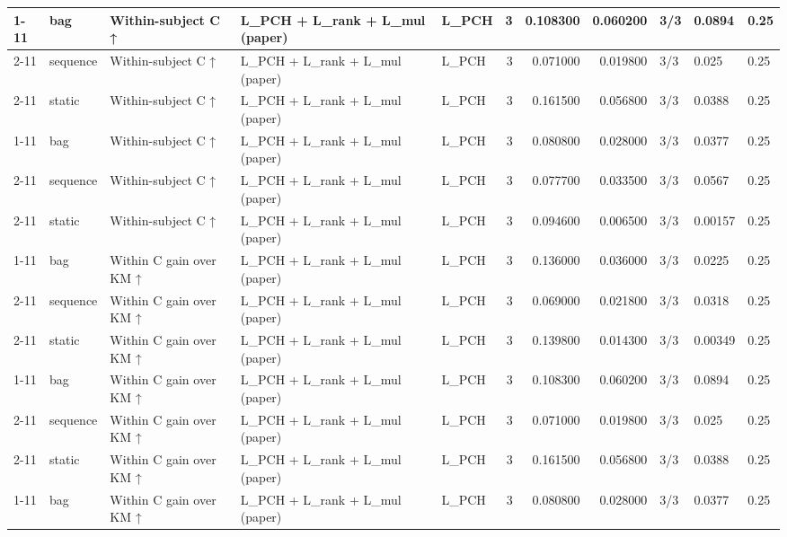 \begin{tabular}{lllllrrrlll}
\cline{1-11} \cline{2-11} \cline{3-11}
\multirow[t]{3}{*}{ehrsim2\_mixed} & bag & Within-subject C ↑ & L\_PCH + L\_rank + L\_mul (paper) & L\_PCH & 3 & 0.108300 & 0.060200 & 3/3 & 0.0894 & 0.25 \\
\cline{2-11} \cline{3-11}
 & sequence & Within-subject C ↑ & L\_PCH + L\_rank + L\_mul (paper) & L\_PCH & 3 & 0.071000 & 0.019800 & 3/3 & 0.025 & 0.25 \\
\cline{2-11} \cline{3-11}
 & static & Within-subject C ↑ & L\_PCH + L\_rank + L\_mul (paper) & L\_PCH & 3 & 0.161500 & 0.056800 & 3/3 & 0.0388 & 0.25 \\
\cline{1-11} \cline{2-11} \cline{3-11}
\multirow[t]{3}{*}{ehrsim2\_order} & bag & Within-subject C ↑ & L\_PCH + L\_rank + L\_mul (paper) & L\_PCH & 3 & 0.080800 & 0.028000 & 3/3 & 0.0377 & 0.25 \\
\cline{2-11} \cline{3-11}
 & sequence & Within-subject C ↑ & L\_PCH + L\_rank + L\_mul (paper) & L\_PCH & 3 & 0.077700 & 0.033500 & 3/3 & 0.0567 & 0.25 \\
\cline{2-11} \cline{3-11}
 & static & Within-subject C ↑ & L\_PCH + L\_rank + L\_mul (paper) & L\_PCH & 3 & 0.094600 & 0.006500 & 3/3 & 0.00157 & 0.25 \\
\cline{1-11} \cline{2-11} \cline{3-11}
\multirow[t]{3}{*}{ehrsim2\_level} & bag & Within C gain over KM ↑ & L\_PCH + L\_rank + L\_mul (paper) & L\_PCH & 3 & 0.136000 & 0.036000 & 3/3 & 0.0225 & 0.25 \\
\cline{2-11} \cline{3-11}
 & sequence & Within C gain over KM ↑ & L\_PCH + L\_rank + L\_mul (paper) & L\_PCH & 3 & 0.069000 & 0.021800 & 3/3 & 0.0318 & 0.25 \\
\cline{2-11} \cline{3-11}
 & static & Within C gain over KM ↑ & L\_PCH + L\_rank + L\_mul (paper) & L\_PCH & 3 & 0.139800 & 0.014300 & 3/3 & 0.00349 & 0.25 \\
\cline{1-11} \cline{2-11} \cline{3-11}
\multirow[t]{3}{*}{ehrsim2\_mixed} & bag & Within C gain over KM ↑ & L\_PCH + L\_rank + L\_mul (paper) & L\_PCH & 3 & 0.108300 & 0.060200 & 3/3 & 0.0894 & 0.25 \\
\cline{2-11} \cline{3-11}
 & sequence & Within C gain over KM ↑ & L\_PCH + L\_rank + L\_mul (paper) & L\_PCH & 3 & 0.071000 & 0.019800 & 3/3 & 0.025 & 0.25 \\
\cline{2-11} \cline{3-11}
 & static & Within C gain over KM ↑ & L\_PCH + L\_rank + L\_mul (paper) & L\_PCH & 3 & 0.161500 & 0.056800 & 3/3 & 0.0388 & 0.25 \\
\cline{1-11} \cline{2-11} \cline{3-11}
\multirow[t]{3}{*}{ehrsim2\_order} & bag & Within C gain over KM ↑ & L\_PCH + L\_rank + L\_mul (paper) & L\_PCH & 3 & 0.080800 & 0.028000 & 3/3 & 0.0377 & 0.25 \\

\end{tabular}
